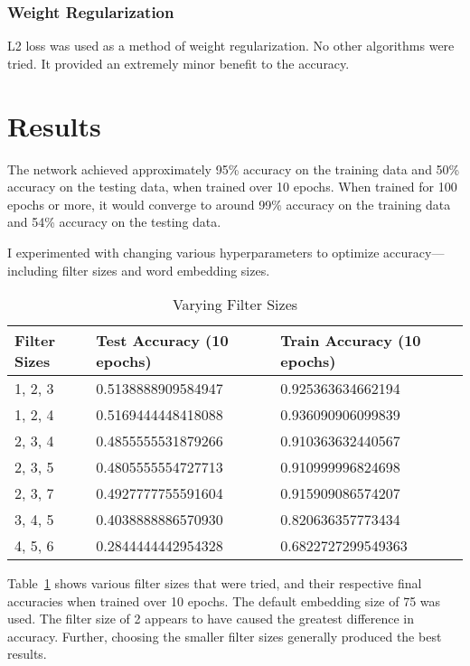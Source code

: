 \documentclass{article}
\begin{document}
\subsubsection{Weight Regularization}
L2 loss was used as a method of weight regularization. No other algorithms were tried. It provided an extremely minor benefit to the accuracy.

\section{Results}
The network achieved approximately 95\% accuracy on the training data and 50\% accuracy on the testing data, when trained over 10 epochs. When trained
for 100 epochs or more, it would converge to around 99\% accuracy on the training data and 54\% accuracy on the testing data.

I experimented with changing various hyperparameters to optimize accuracy—including filter sizes and word embedding sizes.

\begin{table}[t]
  \caption{Varying Filter Sizes}
  \label{tab:filter_sizes}
  \centering
  \begin{tabular}{lll}
    \toprule
    Filter Sizes & Test Accuracy (10 epochs) & Train Accuracy (10 epochs) \\
    \midrule
    1, 2, 3 & 0.5138888909584947 & 0.925363634662194 \\
    1, 2, 4 & 0.5169444448418088 & 0.936090906099839 \\
    2, 3, 4 & 0.4855555531879266 & 0.910363632440567 \\
    2, 3, 5 & 0.4805555554727713 & 0.910999996824698 \\
    2, 3, 7 & 0.4927777755591604 & 0.915909086574207 \\
    3, 4, 5 & 0.4038888886570930 & 0.820636357773434 \\
    4, 5, 6 & 0.2844444442954328 & 0.6822727299549363 \\
    \bottomrule
  \end{tabular}
\end{table}

\newpage
Table~\ref{tab:filter_sizes} shows various filter sizes that were tried, and their respective final accuracies when trained over 10 epochs.
The default embedding size of 75 was used.
The filter size of 2 appears to have caused the greatest difference in accuracy. Further, choosing the smaller filter sizes generally
produced the best results.
\end{document}
